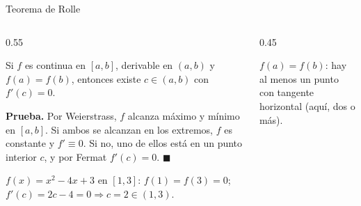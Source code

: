 \documentclass[10pt,aspectratio=169]{beamer}
\begin{document}
\begin{frame}{Teorema de Rolle}
  \begin{columns}
    \begin{column}{0.55\textwidth}
      \begin{teorema}[Rolle]
        Si $f$ es continua en $[a,b]$, derivable en $(a,b)$ y $f(a)=f(b)$, entonces existe $c\in(a,b)$ con $f'(c)=0$.
      \end{teorema}
      \textbf{Prueba.} Por Weierstrass, $f$ alcanza máximo y mínimo en $[a,b]$. Si ambos se alcanzan en los extremos, $f$ es constante y
      $f'\equiv0$. Si no, uno de ellos está en un punto interior $c$, y por Fermat $f'(c)=0$. $\blacksquare$
      \begin{ejemplo}[1]
        $f(x)=x^2-4x+3$ en $[1,3]$: $f(1)=f(3)=0$; \ $f'(c)=2c-4=0\Rightarrow c=2\in(1,3)$. \checkmark
      \end{ejemplo}
    \end{column}
    \begin{column}{0.45\textwidth}
      \centering

      \small $f(a)=f(b)$: hay al menos un punto con tangente horizontal (aquí, dos o más).
    \end{column}
  \end{columns}
\end{frame}
\end{document}
